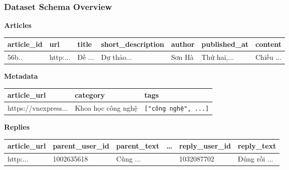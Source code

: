 \documentclass{beamer}
\begin{document}
\begin{frame}
    \frametitle{Dataset Schema Overview}

    \scriptsize
    \ttfamily
    \setlength{\tabcolsep}{3pt}
    \renewcommand{\arraystretch}{1.25}

    \begin{center}
        \textbf{Articles}
    \end{center}
    \vspace{0.3em}

    \centering
    \begin{tabular}{|l|l|l|l|l|l|l|}
        \hline
        \rowcolor{headArticles}
        \textbf{article\_id} & \textbf{url}           & \textbf{title}   & \textbf{short\_description} &
        \textbf{author}      & \textbf{published\_at} & \textbf{content}                                                                  \\
        \hline
        56b..                & http:...               & Đề ...           & Dự thảo...                  & Sơn Hà & Thứ hai,... & Chiều ... \\
        \hline
    \end{tabular}

    \vspace{0.9em}

    \textbf{Metadata}\par\vspace{0.3em}

    \centering
    \begin{tabular}{|l|l|l|}
        \hline
        \rowcolor{headMetadata}
        \textbf{article\_url} & \textbf{category}  & \textbf{tags}               \\
        \hline
        https://vnexpress...  & Khoa học công nghệ & \texttt{["công nghệ", ...]} \\
        \hline
    \end{tabular}

    \vspace{0.9em}

    \textbf{Replies}\par\vspace{0.3em}

    \centering
    \begin{tabular}{|l|l|l|c|l|l|}
        \hline
        \rowcolor{headReplies}
        \textbf{article\_url} & \textbf{parent\_user\_id} & \textbf{parent\_text} &
        \textbf{\dots}        & \textbf{reply\_user\_id}  & \textbf{reply\_text}                                  \\
        \hline
        http:...              & 1002635618                & Cũng ...              &   & 1032087702 & Đúng rồi ... \\
        \hline
    \end{tabular}


\end{frame}
\end{document}
